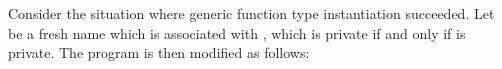 \documentclass[makeidx]{article}
\begin{document}
{{%
%
%
%
%
%
%
%

\LMHash{}%
Consider the situation where generic function type instantiation succeeded.
Let \gmiName{} be a fresh name which is associated with \id{},
which is private if and only if \id{} is private.
The program is then modified as follows:

}}
\end{document}
